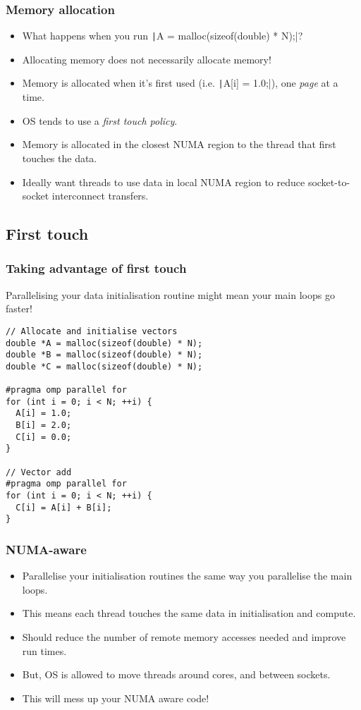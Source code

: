 \documentclass{beamer}
\begin{document}
\begin{frame}
\frametitle{Memory allocation}
\begin{itemize}
  \item What happens when you run \texttt|A = malloc(sizeof(double) * N);|?
  \pause
  \item Allocating memory does not necessarily allocate memory!
  \item Memory is allocated when it's first used (i.e. \texttt|A[i] = 1.0;|), one \emph{page} at a time.
  \item OS tends to use a \emph{first touch policy}.
  \item Memory is allocated in the closest NUMA region to the thread that first touches the data.
  \item Ideally want threads to use data in local NUMA region to reduce socket-to-socket interconnect transfers.
\end{itemize}
\end{frame}

\subsection{First touch}
\begin{frame}[fragile]
\frametitle{Taking advantage of first touch}
Parallelising your data initialisation routine might mean your main loops go faster!


\begin{verbatim}
// Allocate and initialise vectors
double *A = malloc(sizeof(double) * N);
double *B = malloc(sizeof(double) * N);
double *C = malloc(sizeof(double) * N);

#pragma omp parallel for
for (int i = 0; i < N; ++i) {
  A[i] = 1.0;
  B[i] = 2.0;
  C[i] = 0.0;
}

// Vector add
#pragma omp parallel for
for (int i = 0; i < N; ++i) {
  C[i] = A[i] + B[i];
}
\end{verbatim}

\end{frame}

\begin{frame}
\frametitle{NUMA-aware}
\begin{itemize}
  \item Parallelise your initialisation routines the same way you parallelise the main loops.
  \item This means each thread touches the same data in initialisation and compute.
  \item Should reduce the number of remote memory accesses needed and improve run times.
  \item But, OS is allowed to move threads around cores, and between sockets.
  \item This will mess up your NUMA aware code!
\end{itemize}
\end{frame}
\end{document}
